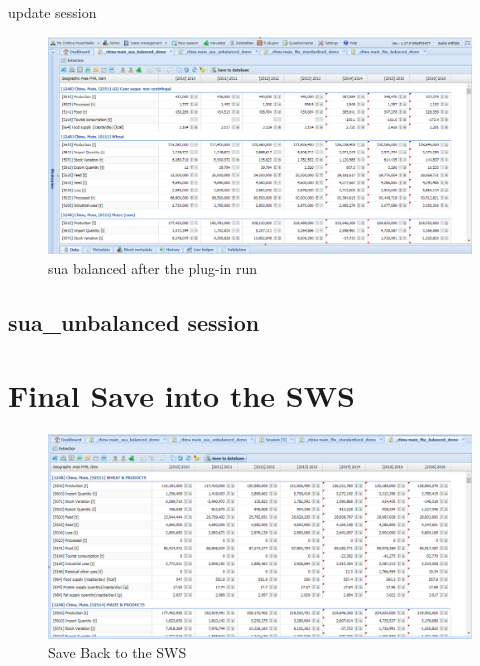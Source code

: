 \documentclass[]{article}
\begin{document}
update session

\begin{figure}[H]

{\centering \includegraphics[width=1\linewidth]{images/standPlugin/38_suaBalancedAfter} 

}

\caption{\label{fig:f37}sua balanced after the plug-in run}\label{fig:f37}
\end{figure}

\subsection{sua\_unbalanced session}\label{sua_unbalanced-session}

\section{Final Save into the SWS}\label{final-save-into-the-sws}

\begin{figure}[H]

{\centering \includegraphics[width=1\linewidth]{images/standPlugin/36_saveBack} 

}

\caption{\label{fig:f38}Save Back to the SWS}\label{fig:f38}
\end{figure}
\end{document}
